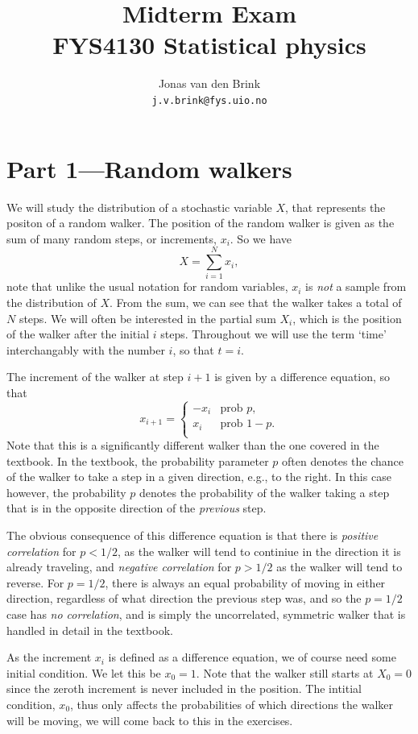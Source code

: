 \documentclass[a4paper, 11pt, notitlepage, english]{article}
\author{Jonas van den Brink \\ \texttt{j.v.brink@fys.uio.no}}
\title{Midterm Exam \\ FYS4130 Statistical physics}
\begin{document}
\maketitle

\section*{Part 1---Random walkers}

We will study the distribution of a stochastic variable $X$, that represents the positon of a random walker. The position of the random walker is given as the sum of many random steps, or increments, $x_i$. So we have
$$X = \sum_{i=1}^N x_i,$$
note that unlike the usual notation for random variables, $x_i$ is \emph{not} a sample from the distribution of $X$. From the sum, we can see that the walker takes a total of $N$ steps. We will often be interested in the partial sum $X_i$, which is the position of the walker after the initial $i$ steps. Throughout we will use the term `time' interchangably with the number $i$, so that $t=i$.

The increment of the walker at step $i+1$ is given by a difference equation, so that 
$$x_{i+1} = \begin{cases}
	-x_i & \mbox{prob } p, \\
	x_i & \mbox{prob } 1-p. \\
\end{cases}$$
Note that this is a significantly different walker than the one covered in the textbook. In the textbook, the probability parameter $p$ often denotes the chance of the walker to take a step in a given direction, e.g., to the right. In this case however, the probability $p$ denotes the probability of the walker taking a step that is in the opposite direction of the \emph{previous} step.

The obvious consequence of this difference equation is that there is \emph{positive correlation} for $p<1/2$, as the walker will tend to continiue in the direction it is already traveling, and \emph{negative correlation} for $p>1/2$ as the walker will tend to reverse. For $p=1/2$, there is always an equal probability of moving in either direction, regardless of what direction the previous step was, and so the $p=1/2$ case has \emph{no correlation}, and is simply the uncorrelated, symmetric walker that is handled in detail in the textbook.

As the increment $x_i$ is defined as a difference equation, we of course need some initial condition. We let this be $x_0 = 1$. Note that the walker still starts at $X_0 = 0$ since the zeroth increment is never included in the position. The intitial condition, $x_0$, thus only affects the probabilities of which directions the walker will be moving, we will come back to this in the exercises.
\end{document}
